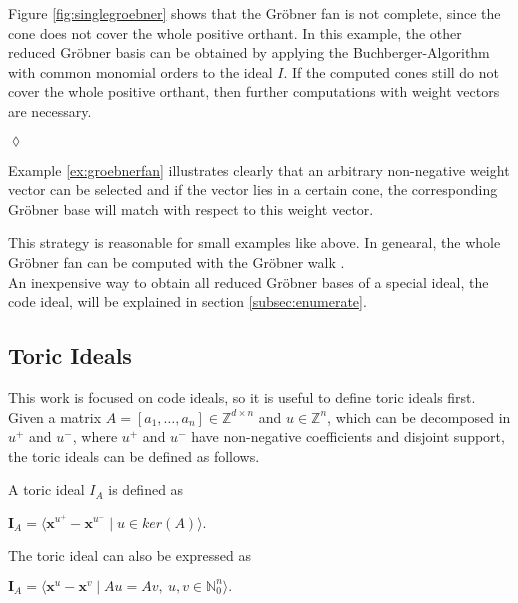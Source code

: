 \begin{env_example}
Figure \ref{fig:singlegroebner} shows that the Gröbner fan is not complete, since the cone does not cover the whole positive orthant. In this example, the other reduced Gröbner basis can be obtained by applying the Buchberger-Algorithm with common monomial orders to the ideal $I$.
If the computed cones still do not cover the whole positive orthant, then further computations with weight vectors are necessary.
\begin{flushright}
$\lozenge$
\end{flushright} 
\end{env_example}

Example \ref{ex:groebnerfan} illustrates clearly that an arbitrary non-negative weight vector can be selected and if the vector lies in a certain cone, the corresponding Gröbner base will match with respect to this weight vector.  


This strategy is reasonable for small examples like above.
In genearal, the whole Gröbner fan can be computed with the Gröbner walk \cite{coxOshea}.\\
An inexpensive way to obtain all reduced Gröbner bases of a special ideal, the code ideal, will be explained in section \ref{subsec:enumerate}.

\newpage
\subsection{Toric Ideals}
\label{subsec:toric}
This work is focused on code ideals, so it is useful to define toric ideals first. Given a matrix $A =\left[a_{1},\dots, a_{n}  \right] \in \mathbb{Z}^{d \times n } $ and $u \in \mathbb{Z}^{n}$, which can be decomposed in $u^{+} $ and $u^{-}$, where $u^{+} $ and $u^{-}$ have non-negative coefficients and disjoint support, the toric ideals can be defined as follows.

\begin{env_definition}
\cite{dueckjournal} A toric ideal $I_{A}$ is defined as
\begin{center}
$ \textbf{I}_{A} = \langle \textbf{x}^{u^{+}} - \textbf{x}^{u^{-}} \mid u \in ker \left(  A \right) \rangle . $
\end{center}


\end{env_definition}

The toric ideal can also be expressed as
\begin{center}
$ \textbf{I}_{A} =  \langle \textbf{x}^{u} - \textbf{x}^{v} \mid Au = Av,~ u,v \in \mathbb{N}^{n}_{0} \rangle .$
\end{center}

\newpage



